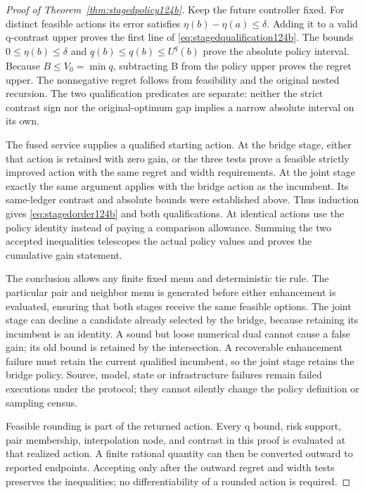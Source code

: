 \begin{proof}[Proof of Theorem~\ref{thm:stagedpolicy124b}]
Keep the future controller fixed. For distinct feasible actions its
error satisfies $\eta(b)-\eta(a)\le\delta$.
Adding it to a valid q-contrast upper proves the first line
of \eqref{eq:stagedqualification124b}. The bounds
$0\le\eta(b)\le\delta$ and
$\underline q(b)\le q(b)\le U^q(b)$ prove the absolute
policy interval. Because $B\le V_0=\min q$, subtracting B
from the policy upper proves the regret upper. The nonnegative
regret follows from feasibility and the original nested recursion.
The two qualification predicates are separate: neither the
strict contrast sign nor the original-optimum gap implies a
narrow absolute interval on its own.

The fused service supplies a qualified starting action.
At the bridge stage, either that action is retained with
zero gain, or the three tests prove a feasible strictly
improved action with the same regret and width requirements.
At the joint stage exactly the same argument applies with
the bridge action as the incumbent. Its same-ledger contrast
and absolute bounds were established above. Thus induction
gives \eqref{eq:stagedorder124b} and both qualifications.
At identical actions use the policy identity instead of
paying a comparison allowance. Summing the two accepted
inequalities telescopes the actual policy values and proves
the cumulative gain statement.

The conclusion allows any finite fixed menu and deterministic
tie rule. The particular pair and neighbor menu is generated
before either enhancement is evaluated, ensuring that both
stages receive the same feasible options. The joint stage
can decline a candidate already selected by the bridge,
because retaining its incumbent is an identity. A sound
but loose numerical dual cannot cause a false gain; its
old bound is retained by the intersection. A recoverable
enhancement failure must retain the current qualified
incumbent, so the joint stage retains the bridge policy.
Source, model, state or infrastructure failures remain
failed executions under the protocol; they cannot silently
change the policy definition or sampling census.

Feasible rounding is part of the returned action. Every
q bound, risk support, pair membership, interpolation node,
and contrast in this proof is evaluated at that realized
action. A finite rational quantity can then be converted
outward to reported endpoints. Accepting only after the
outward regret and width tests preserves the inequalities;
no differentiability of a rounded action is required.
\end{proof}


